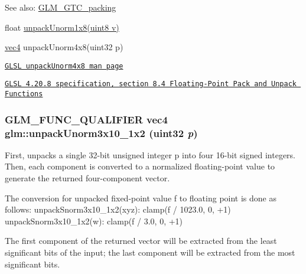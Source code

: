 \begin{Desc}
\item[See also:]\hyperlink{group__gtc__packing}{GLM\_\-GTC\_\-packing} 

float \hyperlink{group__gtc__packing_g32f3f2642df2ea87449d59fb614a8305}{unpackUnorm1x8(uint8 v)} 

\hyperlink{group__core__types_g5881b1b022d7fd1b7218f5916532dd02}{vec4} unpackUnorm4x8(uint32 p) 

\href{http://www.opengl.org/sdk/docs/manglsl/xhtml/unpackUnorm4x8.xml}{\tt GLSL unpackUnorm4x8 man page} 

\href{http://www.opengl.org/registry/doc/GLSLangSpec.4.20.8.pdf}{\tt GLSL 4.20.8 specification, section 8.4 Floating-Point Pack and Unpack Functions} \end{Desc}
\hypertarget{group__gtc__packing_gf69ace2b5e9234f8afb4e99c3df1193d}{
\subsubsection[unpackUnorm3x10\_\-1x2]{\setlength{\rightskip}{0pt plus 5cm}GLM\_\-FUNC\_\-QUALIFIER vec4 glm::unpackUnorm3x10\_\-1x2 (uint32 {\em p})}}
\label{group__gtc__packing_gf69ace2b5e9234f8afb4e99c3df1193d}


First, unpacks a single 32-bit unsigned integer p into four 16-bit signed integers. Then, each component is converted to a normalized floating-point value to generate the returned four-component vector.

The conversion for unpacked fixed-point value f to floating point is done as follows: unpackSnorm3x10\_\-1x2(xyz): clamp(f / 1023.0, 0, +1) unpackSnorm3x10\_\-1x2(w): clamp(f / 3.0, 0, +1)

The first component of the returned vector will be extracted from the least significant bits of the input; the last component will be extracted from the most significant bits.

